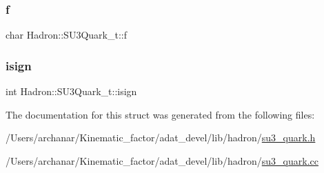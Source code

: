 \mbox{\label{structHadron_1_1SU3Quark__t_a3607400b071fe522d2f3e62048affe73}} 
\subsubsection{\texorpdfstring{f}{f}}
{\footnotesize\ttfamily char Hadron\+::\+S\+U3\+Quark\+\_\+t\+::f}

\mbox{\label{structHadron_1_1SU3Quark__t_a1ab0d1ef0eb3573f07a0f96012b68fa8}} 
\subsubsection{\texorpdfstring{isign}{isign}}
{\footnotesize\ttfamily int Hadron\+::\+S\+U3\+Quark\+\_\+t\+::isign}



The documentation for this struct was generated from the following files\+:\begin{DoxyCompactItemize}
\item 
/\+Users/archanar/\+Kinematic\+\_\+factor/adat\+\_\+devel/lib/hadron/\mbox{\hyperlink{lib_2hadron_2su3__quark_8h}{su3\+\_\+quark.\+h}}\item 
/\+Users/archanar/\+Kinematic\+\_\+factor/adat\+\_\+devel/lib/hadron/\mbox{\hyperlink{su3__quark_8cc}{su3\+\_\+quark.\+cc}}\end{DoxyCompactItemize}
